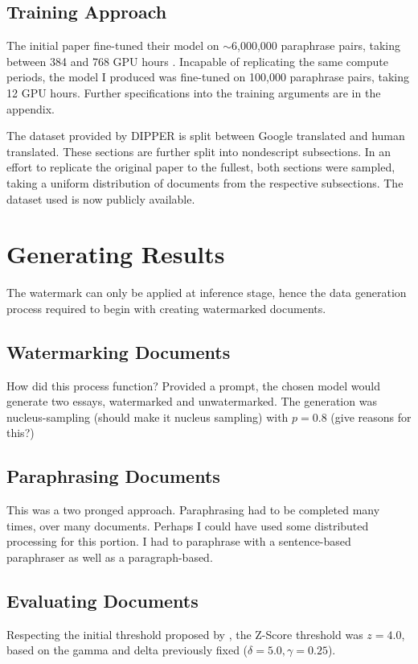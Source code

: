 \documentclass{l4proj}
\theoremstyle{definition}
\begin{document}
    \subsection{Training Approach}
        The initial paper fine-tuned their model on $\sim$6,000,000 paraphrase pairs, taking between 384 and 768 GPU hours \citep{krishna2023paraphrasing}. Incapable of replicating the same compute periods, the model I produced was fine-tuned on 100,000 paraphrase pairs, taking 12 GPU hours.
        Further specifications into the training arguments are in the appendix. %

        The dataset provided by DIPPER is split between Google translated and human translated. These sections are further split into nondescript subsections. In an effort to replicate the original paper to the fullest, both sections were sampled, taking a uniform distribution of documents from the respective subsections. 
        The dataset used is now publicly available.
        
\section{Generating Results} %
    The watermark can only be applied at inference stage, hence the data generation process required to begin with creating watermarked documents. 

    \subsection{Watermarking Documents}
        How did this process function? Provided a prompt, the chosen model would generate two essays, watermarked and unwatermarked. The generation was nucleus-sampling (should make it nucleus sampling) with $p = 0.8$ (give reasons for this?) \newline 

    \subsection{Paraphrasing Documents}
        This was a two pronged approach. Paraphrasing had to be completed many times, over many documents. Perhaps I could have used some distributed processing for this portion. 
        I had to paraphrase with a sentence-based paraphraser as well as a paragraph-based.

    \subsection{Evaluating Documents}
        Respecting the initial threshold proposed by \citet{kirchenbauer2023watermark}, the Z-Score threshold was $z = 4.0$, based on the gamma and delta previously fixed ($\delta = 5.0, \gamma = 0.25$). 
\end{document}
